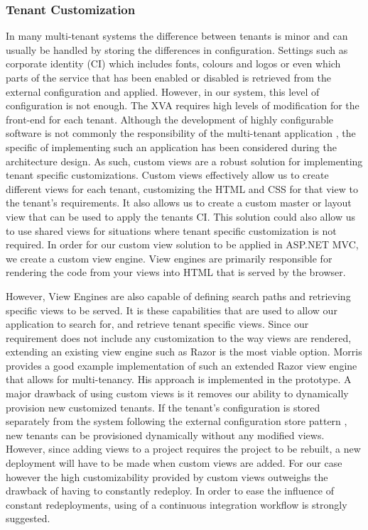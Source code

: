 \subsubsection{Tenant Customization}
\label{sec:viewengine}
In many multi-tenant systems the difference between tenants is minor and can usually be handled by storing the differences in configuration. Settings such as corporate identity (CI) which includes fonts, colours and logos or even which parts of the service that has been enabled or disabled is retrieved from the external configuration and applied. However, in our system, this level of configuration is not enough. The XVA requires high levels of modification for the front-end for each tenant. Although the development of highly configurable software is not commonly the responsibility of the multi-tenant application \cite{Krebs2012}, the specific of implementing such an application has been considered during the architecture design. As such, custom views are a robust solution for implementing tenant specific customizations. Custom views effectively allow us to create different views for each tenant, customizing the HTML and CSS for that view to the tenant's requirements. It also allows us to create a custom master or layout view that can be used to apply the tenants CI. This solution could also allow us to use shared views for situations where tenant specific customization is not required. In order for our custom view solution to be applied in ASP.NET  MVC, we create a custom view engine. View engines are primarily responsible for rendering the code from your views into HTML that is served by the browser.

However, View Engines are also capable of defining search paths and retrieving specific views to be served. It is these capabilities that are used to allow our application to search for, and retrieve tenant specific views. Since our requirement does not include any customization to the way views are rendered, extending an existing view engine such as Razor is the most viable option. Morris \cite{Morris} provides a good example implementation of such an extended Razor view engine that allows for multi-tenancy. His approach is implemented in the prototype. A major drawback of using custom views is it removes our ability to dynamically provision new customized tenants. If the tenant's configuration is stored separately from the system following the external configuration store pattern \cite{Homer2014}, new tenants can be provisioned dynamically without any modified views. However, since adding views to a project requires the project to be rebuilt, a new deployment will have to be made when custom views are added. For our case however the high customizability provided by custom views outweighs the drawback of having to constantly redeploy. In order to ease the influence of constant redeployments, using of a continuous integration workflow is strongly suggested.


